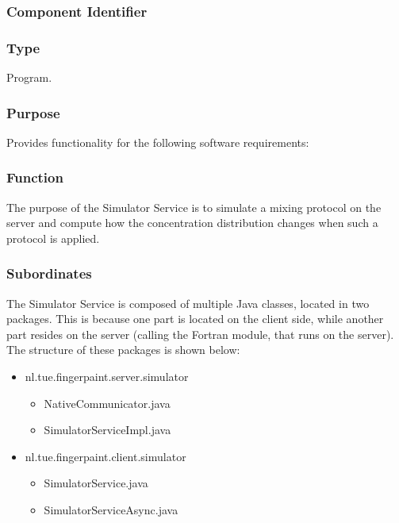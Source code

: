 \subsubsection*{Component Identifier}
\RTMSSS{}

\subsubsection*{Type}
Program.

\subsubsection*{Purpose}
Provides functionality for the following software requirements:

\noindent {}

\subsubsection*{Function}
The purpose of the Simulator Service is to simulate a mixing protocol on the server and compute how the concentration distribution changes when such a protocol is applied.

\subsubsection*{Subordinates}
The Simulator Service is composed of multiple Java classes, located in two packages. This is because one part is located on the client side, while another part resides on the server (calling the Fortran module, that runs on the server). The structure of these packages is shown below:
\begin{itemize}
	\item nl.tue.fingerpaint.server.simulator
		\begin{itemize}
			\item NativeCommunicator.java
			\item SimulatorServiceImpl.java
		\end{itemize}
	
	\item nl.tue.fingerpaint.client.simulator
		\begin{itemize}
			\item SimulatorService.java
			\item SimulatorServiceAsync.java
		\end{itemize}
\end{itemize}

